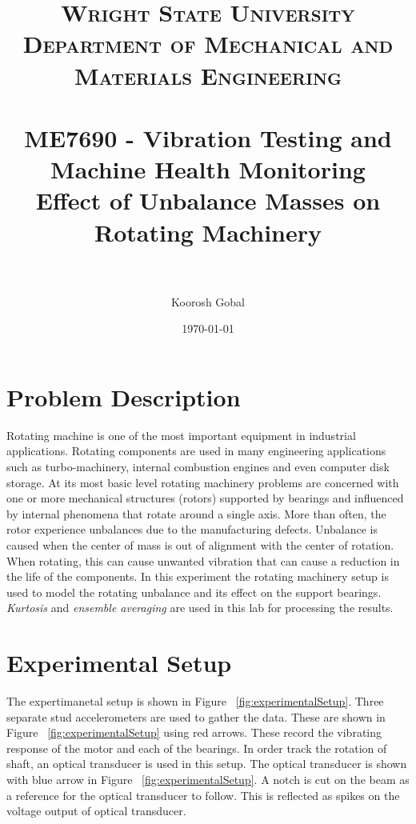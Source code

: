 \documentclass[paper=a4, fontsize=12pt]{scrartcl} %
\title{	
\normalfont \normalsize 
\textsc{Wright State University\\ Department of Mechanical and Materials Engineering} \\ [25pt] %
\horrule{0.5pt} \\[0.4cm] %
\large ME7690 - Vibration Testing and Machine Health Monitoring \\ %
\huge Effect of Unbalance Masses on Rotating Machinery\\
\horrule{2pt} \\[0.5cm] %
}
\author{Koorosh Gobal} %
\date{\normalsize\today} %
\begin{document}
\maketitle %

\section*{Problem Description}
Rotating machine is one of the most important equipment in industrial applications. Rotating components are used in many engineering applications such as turbo-machinery, internal combustion engines and even computer disk storage. At its most basic level rotating machinery problems are concerned with one or more mechanical structures (rotors) supported by bearings and influenced by internal phenomena that rotate around a single axis. More than often, the rotor experience unbalances due to the manufacturing defects. Unbalance is caused when the center of mass is out of alignment with the center of rotation. When rotating, this can cause unwanted vibration that can cause a reduction in the life of the components. In this experiment the rotating machinery setup is used to model the rotating unbalance and its effect on the support bearings. \emph{Kurtosis} and \emph{ensemble averaging} are used in this lab for processing the results.
\section*{Experimental Setup}
The expertimanetal setup is shown in Figure ~\ref{fig:experimentalSetup}. Three separate stud accelerometers are used to gather the data. These are shown in Figure ~\ref{fig:experimentalSetup} using red arrows. These record the vibrating response of the motor and each of the bearings. In order track the rotation of shaft, an optical transducer is used in this setup. The optical transducer is shown with blue arrow in Figure ~\ref{fig:experimentalSetup}. A notch is cut on the beam as a reference for the optical transducer to follow. This is reflected as spikes on the voltage output of optical transducer.\\
\end{document}
